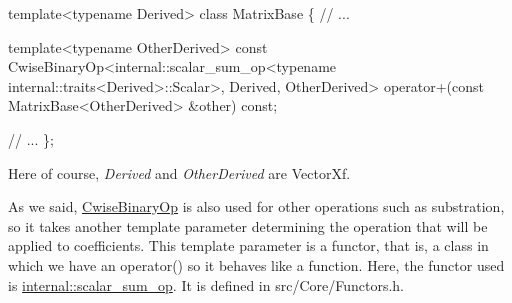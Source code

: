 \begin{DoxyCode}
\textcolor{keyword}{template}<\textcolor{keyword}{typename} Derived>
\textcolor{keyword}{class }MatrixBase
\{
  \textcolor{comment}{// ...}

  \textcolor{keyword}{template}<\textcolor{keyword}{typename} OtherDerived>
  \textcolor{keyword}{const} CwiseBinaryOp<internal::scalar\_sum\_op<typename internal::traits<Derived>::Scalar>, Derived, 
      OtherDerived>
  operator+(\textcolor{keyword}{const} MatrixBase<OtherDerived> &other) \textcolor{keyword}{const};

  \textcolor{comment}{// ...}
\};
\end{DoxyCode}


Here of course, {\itshape Derived} and {\itshape Other\+Derived} are Vector\+Xf.

As we said, \hyperlink{group___core___module_class_eigen_1_1_cwise_binary_op}{Cwise\+Binary\+Op} is also used for other operations such as substration, so it takes another template parameter determining the operation that will be applied to coefficients. This template parameter is a functor, that is, a class in which we have an operator() so it behaves like a function. Here, the functor used is \hyperlink{struct_eigen_1_1internal_1_1scalar__sum__op}{internal\+::scalar\+\_\+sum\+\_\+op}. It is defined in src/\+Core/\+Functors.\+h.

